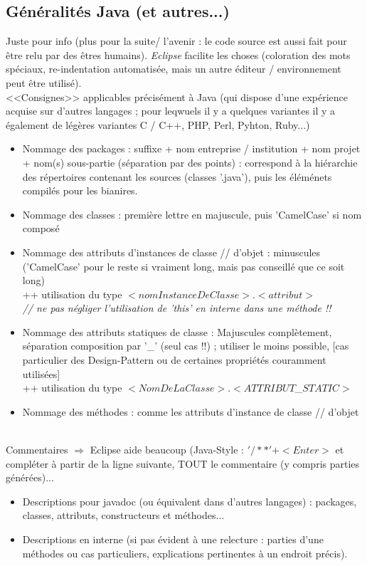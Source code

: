 \documentclass[11pt,twoside,a4paper]{article}
\begin{document}
\subsection{G{\'e}n{\'e}ralit{\'e}s Java (et autres...)}

Juste pour info (plus pour la suite/ l'avenir : le code source est aussi fait pour {\^e}tre relu par des {\^e}tres humains). \emph{Eclipse} facilite les choses (coloration des mots sp{\'e}ciaux, re-indentation automatis{\'e}e, mais un autre {\'e}diteur / environnement  peut {\^e}tre utilis{\'e}).~\\

<<Consignes>> applicables pr{\'e}cis{\'e}ment {\`a} Java (qui dispose d'une exp{\'e}rience acquise sur d'autres langages ; pour leqwuels il y a quelques variantes il y a {\'e}galement de l{\'e}g{\`e}res variantes C / C++, PHP, Perl, Pyhton, Ruby...)
\begin{itemize}
	\item[] Nommage des packages : suffixe + nom entreprise / institution + nom projet + nom(s) sous-partie (s{\'e}paration par des points) : correspond {\`a} la hi{\'e}rarchie des r{\'e}pertoires contenant les sources (classes '.java'), puis les {\'e}l{\'e}m{\'e}nets compil{\'e}s pour les bianires. 
	\item[] Nommage des classes : premi{\`e}re lettre en majuscule, puis 'CamelCase' si nom compos{\'e}
	\item[] Nommage des attributs d'instances de classe // d'objet : minuscules ('CamelCase' pour le reste si vraiment long, mais pas conseill{\'e} que ce soit long)~\\
		++ utilisation du type $<nomInstanceDeClasse>.<attribut>$~\\
		\emph{// ne pas n{\'e}gliger l'utilisation de 'this' en interne dans une m{\'e}thode !!}~\\
	\item[] Nommage des attributs statiques de classe : Majuscules compl{\`e}tement, s{\'e}paration composition par '\_' (seul cas !!) ; utiliser le moins possible, [cas particulier des Design-Pattern ou de certaines propri{\'e}t{\'e}s couramment utilis{\'e}es]~\\
		++ utilisation du type $<NomDeLaClasse>.<ATTRIBUT$\_$STATIC>$
	\item[] Nommage des m{\'e}thodes : comme les attributs d'instance de classe // d'objet 
\end{itemize}~\\

Commentaires $\Longrightarrow$ Eclipse aide beaucoup (Java-Style : $'/**'+<Enter>$ et compl{\'e}ter {\`a} partir de la ligne suivante, TOUT le commentaire (y compris parties g{\'e}n{\'e}r{\'e}es)...
\begin{itemize}
	\item[] Descriptions pour javadoc (ou {\'e}quivalent dans d'autres langages) : packages, classes, attributs, constructeurs et m{\'e}thodes...
	\item[] Descriptions en interne (si pas {\'e}vident {\`a} une relecture : parties d'une m{\'e}thodes ou cas particuliers, explications pertinentes {\`a} un endroit pr{\'e}cis). 
\end{itemize}~\\
\end{document}
